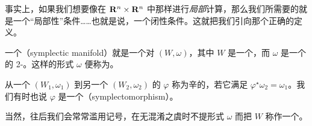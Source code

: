 事实上，如果我们想要像在 $\mathbf{R}^n\times\mathbf{R}^n$ 中那样进行\emph{局部}计算，那么我们所需要的就是一个“局部\trExact{}性”条件……也就是说，一个闭性条件。这就把我们引向那个正确的定义。

\begin{definition}\label{thm:symplectic-manifold-definition}
一个\textbf{\trSymplectic\trManifold}（symplectic manifold）就是一个对 $(W,\omega)$，其中 $W$ 是一个\trManifold，而 $\omega$ 是一个\trNondegenerate{}的\trClosed{} 2-\trForm。这样的形式 $\omega$ 便称为\trSymplecticForm。
\end{definition}

从一个\trSymplectic\trManifold{} $(W_1,\omega_1)$ 到另一个 $(W_2,\omega_2)$ 的\trDiffeomorphism{} $\varphi$ 称为辛的，若它满足 $\varphi^\star\omega_2=\omega_1$。我们有时也说 $\varphi$ 是一个\textbf{\trSymplectomorphism}（symplectomorphism）。

当然，往后我们会常常滥用记号，在无混淆之虞时不提形式 $\omega$ 而把 $W$ 称作一个\trSymplectic\trManifold。
